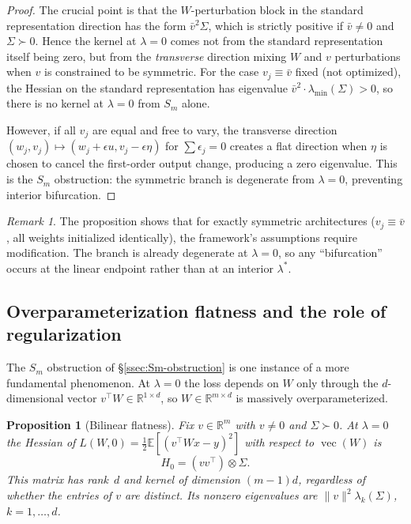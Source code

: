 \documentclass[11pt, reqno]{amsart}
\theoremstyle{plain}
\newtheorem{proposition}[theorem]{Proposition}
\theoremstyle{definition}
\theoremstyle{remark}
\newtheorem{remark}[theorem]{Remark}
\begin{document}
\begin{proof}
The crucial point is that the $W$-perturbation block in the standard representation direction has the form $\bar{v}^2\Sigma$, which is strictly positive if $\bar{v}\neq 0$ and $\Sigma\succ 0$. Hence the kernel at $\lambda=0$ comes not from the standard representation itself being zero, but from the \emph{transverse} direction mixing $W$ and $v$ perturbations when $v$ is constrained to be symmetric. For the case $v_j\equiv \bar{v}$ fixed (not optimized), the Hessian on the standard representation has eigenvalue $\bar{v}^2 \cdot\lambda_{\min}(\Sigma)>0$, so there is no kernel at $\lambda=0$ from $S_m$ alone.

However, if all $v_j$ are equal and free to vary, the transverse direction $(w_j,v_j)\mapsto (w_j+\epsilon u, v_j-\epsilon\eta)$ for $\sum\epsilon_j=0$ creates a flat direction when $\eta$ is chosen to cancel the first-order output change, producing a zero eigenvalue. This is the $S_m$ obstruction: the symmetric branch is degenerate from $\lambda=0$, preventing interior bifurcation.
\end{proof}

\begin{remark}
The proposition shows that for exactly symmetric architectures ($v_j\equiv \bar{v}$, all weights initialized identically), the framework's assumptions require modification. The branch is already degenerate at $\lambda=0$, so any ``bifurcation'' occurs at the linear endpoint rather than at an interior $\lambda^*$.
\end{remark}

\subsection{Overparameterization flatness and the role of regularization}\label{ssec:symmetry-breaking}

The $S_m$ obstruction of \S\ref{ssec:Sm-obstruction} is one instance of a more fundamental phenomenon.  At $\lambda=0$ the loss depends on $W$ only through the $d$-dimensional vector $v^\top W\in\mathbb R^{1\times d}$, so $W\in\mathbb R^{m\times d}$ is massively overparameterized.

\begin{proposition}[Bilinear flatness]\label{prop:bilinear-flat}
Fix $v\in\mathbb R^m$ with $v\neq 0$ and $\Sigma\succ 0$.
At $\lambda=0$ the Hessian of $L(W,0)=\tfrac12\mathbb E[(v^\top Wx-y)^2]$ with respect to $\operatorname{vec}(W)$ is
\begin{equation}\label{eq:hess-lambda0}
  H_0 = (vv^\top)\otimes\Sigma.
\end{equation}
This matrix has rank~$d$ and kernel of dimension $(m-1)d$, \emph{regardless of whether the entries of $v$ are distinct}.  Its nonzero eigenvalues are $\|v\|^2\lambda_k(\Sigma)$, $k=1,\ldots,d$.
\end{proposition}
\end{document}
